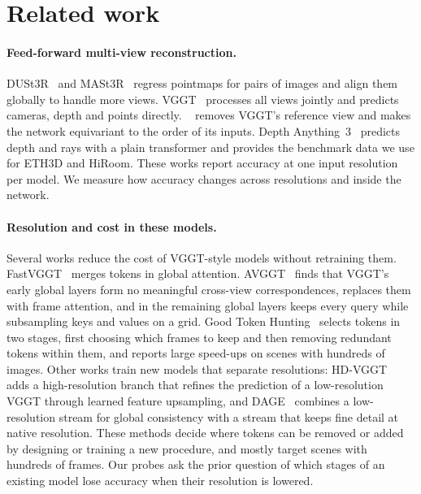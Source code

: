 \section{Related work}
\label{sec:related}

\paragraph{Feed-forward multi-view reconstruction.}
DUSt3R~\cite{wang2024dust3r} and MASt3R~\cite{leroy2024mast3r} regress pointmaps for pairs of images and align them globally to handle more views. VGGT~\cite{wang2025vggt} processes all views jointly and predicts cameras, depth and points directly. \pithree~\cite{wang2025pi3} removes VGGT's reference view and makes the network equivariant to the order of its inputs. Depth Anything~3~\cite{lin2025da3} predicts depth and rays with a plain transformer and provides the benchmark data we use for ETH3D and HiRoom. These works report accuracy at one input resolution per model. We measure how accuracy changes across resolutions and inside the network.

\paragraph{Resolution and cost in these models.}
Several works reduce the cost of VGGT-style models without retraining them. FastVGGT~\cite{shen2025fastvggt} merges tokens in global attention. AVGGT~\cite{sun2025avggt} finds that VGGT's early global layers form no meaningful cross-view correspondences, replaces them with frame attention, and in the remaining global layers keeps every query while subsampling keys and values on a grid. Good Token Hunting~\cite{goodtoken2026} selects tokens in two stages, first choosing which frames to keep and then removing redundant tokens within them, and reports large speed-ups on scenes with hundreds of images. Other works train new models that separate resolutions: HD-VGGT~\cite{hdvggt2026} adds a high-resolution branch that refines the prediction of a low-resolution VGGT through learned feature upsampling, and DAGE~\cite{ngo2026dage} combines a low-resolution stream for global consistency with a stream that keeps fine detail at native resolution. These methods decide where tokens can be removed or added by designing or training a new procedure, and mostly target scenes with hundreds of frames. Our probes ask the prior question of which stages of an existing model lose accuracy when their resolution is lowered.


